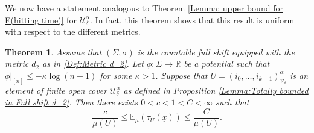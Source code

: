 \documentclass[11pt, reqno]{amsart}
\theoremstyle{plain}%
\newtheorem{theorem}{Theorem}[section]
\theoremstyle{definition}
\theoremstyle{definition}
\def\R{\ensuremath{\mathbb R}}
\def\E{\mathbb E}
\def\st{such that }
\def\ulx{\underline{x}}
\numberwithin{equation}{section}
\begin{document}
We now have a statement analogous to Theorem \ref{Lemma: upper bound for E(hitting time)} for $\mathcal{U}_\delta^{\alpha}$. In fact, this theorem shows that this result is uniform with respect to the different metrics.
\begin{theorem}\label{Lemma: upper bound for E(hitting time) d_2}
Assume that $(\Sigma,\sigma)$ is the countable full shift equipped with the metric $d_2$ as in \eqref{Def:Metric d_2}. Let $\phi:\Sigma\to\R$ be a potential \st $\phi\big|_{[n]}\le -\kappa\log (n+1)$ for some $\kappa>1$. Suppose that $ U=(i_0,\ldots,i_{k-1})_{\mathcal{V}_\delta}^{\alpha}$ is an element of finite open cover $\mathcal{U}_\delta^{\alpha}$ as defined in Proposition \ref{Lemma:Totally bounded in Full shift d_2}. Then there exists $0<c<1<C<\infty$ such that $$ \frac{c}{\mu( U)} \le\E_\mu\left(\tau_{U}(\ulx)\right)\le \frac{C}{\mu( U)}.$$
\end{theorem}
\end{document}
